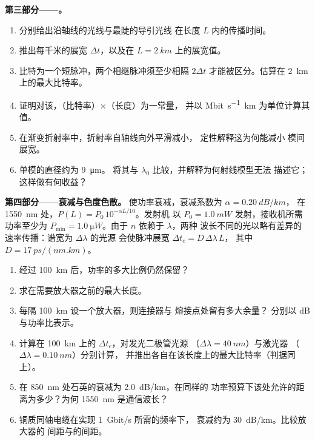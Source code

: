 \begin{problem}
\medskip
\noindent\textbf{第三部分——。}
\begin{enumerate}[resume]
  \item 分别给出沿轴线的光线与最陡的导引光线
        在长度 $L$ 内的传播时间。
  \item 推出每千米的展宽 $\Delta t$，以及在
        $L = \qty{2}{km}$ 上的展宽值。
  \item 比特为一个短脉冲，两个相继脉冲须至少相隔
        $2\Delta t$ 才能被区分。估算在
        \qty{2}{km} 上的最大比特率。
  \item 证明对该，（比特率）$\times$（长度）为一常量，
        并以 \unit{Mbit.s^{-1}.km} 为单位计算其值。
  \item 在渐变折射率中，折射率自轴线向外平滑减小，
        定性解释这为何能减小
        模间展宽。
  \item 单模的直径约为 \qty{9}{\micro m}。
        将其与 $\lambda_0$ 比较，并解释为何射线模型无法
        描述它；这样做有何收益？
\end{enumerate}

\medskip
\noindent\textbf{第四部分——衰减与色度色散。}
使功率衰减，衰减系数为 $\alpha = \qty{0.20}{dB/km}$，
在 \qty{1550}{nm} 处，$P(L) = P_0\,10^{-\alpha L/10}$。发射机
以 $P_0 = \qty{1.0}{mW}$ 发射，接收机所需功率至少为
$P_{\min} = \qty{1.0}{\micro W}$。由于 $n$ 依赖于 $\lambda$，两种
波长不同的光以略有差异的速率传播：谱宽为 $\Delta\lambda$ 的光源
会使脉冲展宽 $\Delta t_c = D\,\Delta\lambda\,L$，
其中 $D = \qty{17}{ps/(nm.km)}$。
\begin{enumerate}[resume]
  \item 经过 \qty{100}{km} 后，功率的多大比例仍然保留？
  \item 求在需要放大器之前的最大长度。
  \item 每隔 \qty{100}{km} 设一个放大器，则连接器与
        熔接点处留有多大余量？
        分别以 dB 与功率比表示。
  \item 计算在 \qty{100}{km} 上的 $\Delta t_c$，对发光二极管光源
        （$\Delta\lambda = \qty{40}{nm}$）与激光器
        （$\Delta\lambda = \qty{0.10}{nm}$）分别计算，
        并推出各自在该长度上的最大比特率（判据同上）。
  \item 在 \qty{850}{nm} 处石英的衰减为 \qty{2.0}{dB/km}，在同样的
        功率预算下该处允许的距离为多少？为何
        \qty{1550}{nm} 是通信波长？
  \item 铜质同轴电缆在实现 \qty{1}{Gbit/s} 所需的频率下，
        衰减约为 \qty{30}{dB/km}。比较放大器的
        间距与的间距。
\end{enumerate}


\end{problem}
